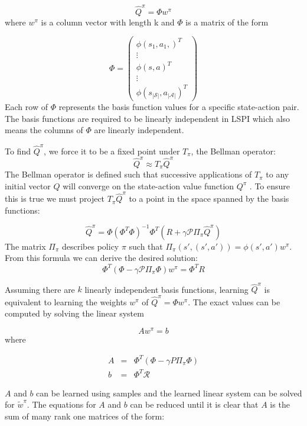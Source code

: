 \[
    \hat{Q}^\pi = \Phi w^\pi
\]
where $w^\pi$ is a column vector with length k and $\Phi$ is a matrix of the form

\[
    \Phi = \begin{pmatrix}
        \phi(s_1,a_1,)^T \\ \vdots \\ \phi(s,a)^T \\ \vdots \\ \phi(s_{|\mathcal{S}|},a_{|\mathcal{A}|})^T
    \end{pmatrix}
\]
Each row of $\Phi$ represents the basis function values for a specific state-action pair. The basis functions are required to be linearly independent in LSPI which also means the columns of $\Phi$ are linearly independent.

To find $\hat{Q}^\pi$, we force it to be a fixed point under $T_\pi$, the Bellman operator:
\[
    \hat{Q}^\pi \approx T_\pi\hat{Q}^\pi
\]
The Bellman operator is defined such that successive applications of $T_\pi$ to any initial vector $Q$ will converge on the state-action value function $Q^\pi$ \cite{lspi}. To ensure this is true we must project $T_\pi\hat{Q}^\pi$ to a point in the space spanned by the basis functions:

\[
    \hat{Q}^\pi = \Phi(\Phi^T\Phi)^{-1}\Phi^T(R + \gamma \mathcal{P}\Pi_\pi\hat{Q}^\pi)
\]
The matrix $\Pi_\pi$ describes policy $\pi$ such that $\Pi_\pi(s',(s',a')) = \phi(s',a')w^\pi$. From this formula we can derive the desired solution:
\[
    \Phi^T(\Phi - \gamma \mathcal{P}\Pi_\pi\Phi)w^\pi = \Phi^TR
\]

Assuming there are $k$ linearly independent basis functions, learning $\hat{Q}^\pi$ is equivalent to learning the weights $w^\pi$ of $\hat{Q}^\pi = \Phi w^\pi$. The exact values can be computed by solving the linear system

\begin{equation}
    Aw^\pi = b
\end{equation}
where

\[
    \begin{array}{rcl}
        A &=& \Phi^T(\Phi - \gamma P\Pi_\pi\Phi) \\
        b &=& \Phi^T\mathcal{R}
    \end{array}
\]

$A$ and $b$ can be learned using samples and the learned linear system can be solved for $\tilde{w}^\pi$. The equations for $A$ and $b$ can be reduced until it is clear that $A$ is the sum of many rank one matrices of the form:

